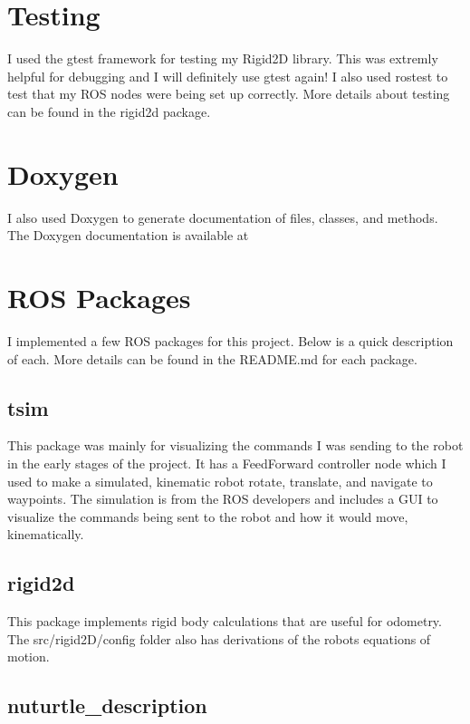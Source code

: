 \section*{Testing}

I used the gtest framework for testing my Rigid2D library. This was extremly helpful for debugging and I will definitely use gtest again! I also used rostest to test that my R\+OS nodes were being set up correctly. More details about testing can be found in the rigid2d package.

\section*{Doxygen}

I also used Doxygen to generate documentation of files, classes, and methods. The Doxygen documentation is available at

\section*{R\+OS Packages}

I implemented a few R\+OS packages for this project. Below is a quick description of each. More details can be found in the R\+E\+A\+D\+M\+E.\+md for each package.

\subsection*{tsim}

This package was mainly for visualizing the commands I was sending to the robot in the early stages of the project. It has a Feed\+Forward controller node which I used to make a simulated, kinematic robot rotate, translate, and navigate to waypoints. The simulation is from the R\+OS developers and includes a G\+UI to visualize the commands being sent to the robot and how it would move, kinematically.

\subsection*{rigid2d}

This package implements rigid body calculations that are useful for odometry. The src/rigid2\+D/config folder also has derivations of the robot\textquotesingle{}s equations of motion.

\subsection*{nuturtle\+\_\+description}

